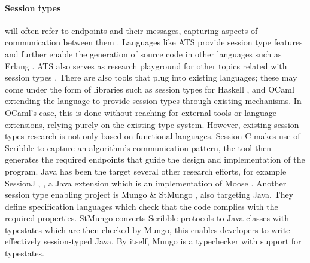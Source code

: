 \paragraph{Session types} will often refer to endpoints and their messages, capturing aspects of communication between them \autocite{Honda1993}.
Languages like ATS provide session type features and further enable the generation of source code in other languages
such as Erlang \autocite{Xi2016}. ATS also serves as research playground for other topics related with session types \autocite{Xi2016a}.
There are also tools that plug into existing languages;
these may come under the form of libraries such as session types
for Haskell \autocite[Section 3.3]{Ancona2016}, \autocite[Chapter 10]{Gay2017} and OCaml \autocite[Chapter 11]{Gay2017}
extending the language to provide session types through existing mechanisms.
In OCaml's case, this is done without reaching for external tools or language extensions,
relying purely on the existing type system.
However, existing session types research is not only based on functional languages.
Session C \autocite[Section 4.1]{Ancona2016} makes use of Scribble \autocite{Yoshida2014} to capture an algorithm's communication pattern,
the tool then generates the required endpoints that guide the design and implementation of the program.
Java has been the target several other research efforts, for example SessionJ \autocite[Section 2.2.1]{Ancona2016}, \autocite{Hu2008},
a Java extension which is an implementation of Moose \autocite[Section 2.1.1]{Ancona2016}.
Another session type enabling project is Mungo \& StMungo \autocite{Kouzapas2018, Voinea2020}, also targeting Java.
They define specification languages which check that the code complies with the required properties.
StMungo converts Scribble protocols to Java classes with typestates which are then checked by Mungo,
this enables developers to write effectively session-typed Java.
By itself, Mungo is a typechecker with support for typestates.


